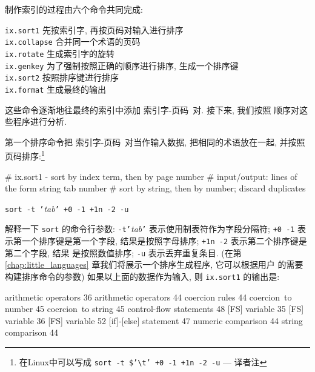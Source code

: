 制作索引的过程由六个命令共同完成:
\begin{tabbing}
\indent\texttt{ix.sort1} \hspace{5em} \= 先按索引字, 再按页码对输入进行排序 \\
\indent\texttt{ix.collapse}    \> 合并同一个术语的页码 \\
\indent\texttt{ix.rotate}  \> 生成索引字的旋转 \\
\indent\texttt{ix.genkey}  \> 为了强制按照正确的顺序进行排序, 生成一个排序键 \\
\indent\texttt{ix.sort2}   \> 按照排序键进行排序 \\
\indent\texttt{ix.format}  \> 生成最终的输出
\end{tabbing}
这些命令逐渐地往最终的索引中添加 \mbox{索引字}-页码\ 对. 接下来, 我们按照
顺序对这些程序进行分析.

第一个排序命令把 \mbox{索引字}-页码\ 对当作输入数据, 把相同的术语放在一起,
并按照页码排序:\footnote{ 在Linux中可以写成
    \texttt{sort -t \$'{\textbackslash}t' +0 -1 +1n -2 -u} --- 译者注}
\begin{awkcode}
    # ix.sort1 - sort by index term, then by page number
    #     input/output: lines of the form string tab number
    #     sort by string, then by number; discard duplicates
\end{awkcode}
\indent\indent\texttt{sort -t '}\textit{tab}\texttt{' +0 -1 +1n -2 -u} \par 
解释一下 \texttt{sort} 的命令行参数: \texttt{-t'}\textit{tab}\texttt{'}
表示使用制表符作为字段分隔符; \texttt{+0 -1} 表示第一个排序键是第一个字段,
结果是按照字母排序; \texttt{+1n -2} 表示第二个排序键是第二个字段, 结果 
是按照数值排序; \texttt{-u} 表示丢弃重复条目. (在第
\ref{chap:little_languages} 章我们将展示一个排序生成程序, 它可以根据用户
的需要构建排序命令的参数) 如果以上面的数据作为输入, 则 \texttt{ix.sort1}
的输出是:
\begin{awkcode}
    arithmetic operators        36
    arithmetic operators        44
    coercion rules      44
    coercion~to number  45
    coercion~to string  45
    control-flow statements     48
    [FS] variable       35
    [FS] variable       36
    [FS] variable       52
    [if]-[else] statement       47
    numeric comparison  44
    string comparison   44
\end{awkcode}

